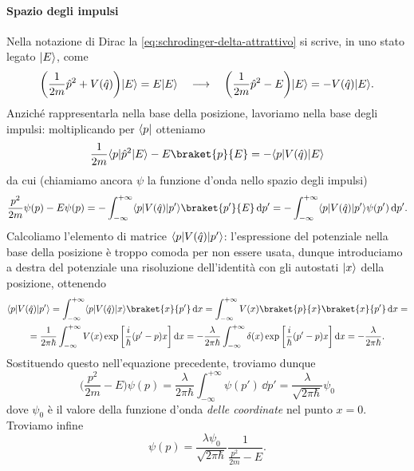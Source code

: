 \paragraph{Spazio degli impulsi}
Nella notazione di Dirac la \eqref{eq:schrodinger-delta-attrattivo} si scrive, in uno stato legato $\lvert E\rangle$, come
\begin{equation}
	\bigg(\frac1{2m}\hat{p}^2+V(\hat{q})\bigg)\lvert E\rangle=E\lvert E\rangle\quad\longrightarrow\quad\bigg(\frac1{2m}\hat{p}^2-E\bigg)\lvert E\rangle=-V(\hat{q})\lvert E\rangle.
	\label{eq:schrodinger-delta-attrattivo-dirac}
\end{equation}
Anzich\'e rappresentarla nella base della posizione, lavoriamo nella base degli impulsi: moltiplicando per $\langle p\rvert$ otteniamo
\begin{equation}
	\frac1{2m}\bra{p}\op p^2\ket{E}-E\braket{p}{E}=-\bra{p}V(\op q)\ket{E}
\end{equation}
da cui (chiamiamo ancora $\psi$ la funzione d'onda nello spazio degli impulsi)
\begin{equation}
	\frac{p^2}{2m}\psi(p)-E\psi(p)=-\int_{-\infty}^{+\infty}\bra{p}V(\op q)\ket{p'}\braket{p'}{E}\,\dd p'=-\int_{-\infty}^{+\infty}\bra{p}V(\op q)\ket{p'}\psi(p')\,\dd p'.
\end{equation}
Calcoliamo l'elemento di matrice $\langle p\rvert V(\hat{q})\lvert p'\rangle$: l'espressione del potenziale nella base della posizione è troppo comoda per non essere usata, dunque introduciamo a destra del potenziale una risoluzione dell'identità con gli autostati $\lvert x\rangle$ della posizione, ottenendo
\begin{multline}
	\bra{p}V(\op q)\ket{p'}=\int_{-\infty}^{+\infty}\bra{p}V(\op q)\ket{x}\braket{x}{p'}\,\dd x=\int_{-\infty}^{+\infty}V(x)\braket{p}{x}\braket{x}{p'}\,\dd x=\\
	=\frac1{2\pi\hbar}\int_{-\infty}^{+\infty}V(x)\exp\bigg[\frac{i}{\hbar}(p'-p)x\bigg]\,\dd x=-\frac{\lambda}{2\pi\hbar}\int_{-\infty}^{+\infty}\delta(x)\exp\bigg[\frac{i}{\hbar}(p'-p)x\bigg]\,\dd x=-\frac{\lambda}{2\pi\hbar}.
\end{multline}
Sostituendo questo nell'equazione precedente, troviamo dunque
\begin{equation}
	\bigg(\frac{p^2}{2m}-E\bigg)\psi(p)=\frac{\lambda}{2\pi\hbar}\int_{-\infty}^{+\infty}\psi(p')\,\dd p'=\frac{\lambda}{\sqrt{2\pi\hbar}}\psi_0
\end{equation}
dove $\psi_0$ è il valore della funzione d'onda \emph{delle coordinate} nel punto $x=0$.
Troviamo infine
\begin{equation}
	\psi(p)=\frac{\lambda\psi_0}{\sqrt{2\pi\hbar}}\frac1{\frac{p^2}{2m}-E}.
	\label{eq:wf-impulsi-delta-attrattivo}
\end{equation}
